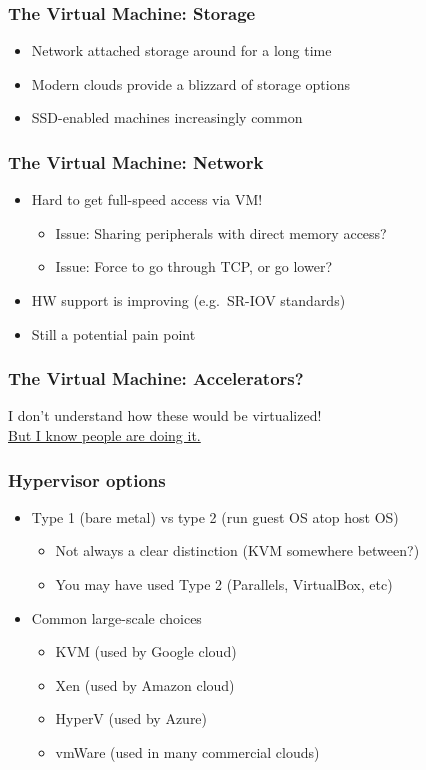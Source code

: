 \documentclass{beamer}
\begin{document}
\begin{frame}
  \frametitle{The Virtual Machine: Storage}

  \begin{itemize}
  \item Network attached storage around for a long time
  \item Modern clouds provide a blizzard of storage options
  \item SSD-enabled machines increasingly common
  \end{itemize}
\end{frame}


\begin{frame}
  \frametitle{The Virtual Machine: Network}

  \begin{itemize}
  \item Hard to get full-speed access via VM!
    \begin{itemize}
    \item Issue: Sharing peripherals with direct memory access?
    \item Issue: Force to go through TCP, or go lower?
    \end{itemize}
  \item HW support is improving (e.g.~SR-IOV standards)
  \item Still a potential pain point
  \end{itemize}
\end{frame}


\begin{frame}
  \frametitle{The Virtual Machine: Accelerators?}

  I don't understand how these would be virtualized! \\
  \href{https://aws.amazon.com/ec2/elastic-gpus/}{But I know people are doing it.}
\end{frame}


\begin{frame}
  \frametitle{Hypervisor options}

  \begin{itemize}
  \item Type 1 (bare metal) vs type 2 (run guest OS atop host OS)
    \begin{itemize}
    \item Not always a clear distinction (KVM somewhere between?)
    \item You may have used Type 2 (Parallels, VirtualBox, etc)
    \end{itemize}
  \item Common large-scale choices
    \begin{itemize}
    \item KVM (used by Google cloud)
    \item Xen (used by Amazon cloud)
    \item HyperV (used by Azure)
    \item vmWare (used in many commercial clouds)
    \end{itemize}
  \end{itemize}
\end{frame}
\end{document}
